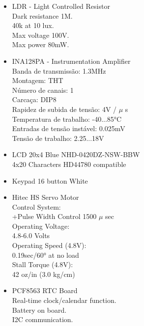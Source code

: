 \begin{minipage}{\linewidth}
\begin{minipage}{0.55\linewidth}
\begin{itemize}
	\item LDR - Light Controlled Resistor \\
		Dark resistance 1M.\\
		40k at 10 lux.\\
		Max voltage 100V.\\
		Max power 80mW.\\
	\item INA128PA - Instrumentation Amplifier \\
		Banda de transmissão: 1.3MHz \\
		Montagem: THT \\
		Número de canais: 1 \\
		Carcaça: DIP8 \\
		Rapidez de subida de tensão: 4V / $\mu$ s \\
		Temperatura de trabalho: -40...85°C \\
		Entradas de tensão instável: 0.025mV \\
		Tensão de trabalho: 2.25...18V \\
	\item LCD 20x4 Blue NHD-0420DZ-NSW-BBW \\
		4x20 Characters HD44780 compatible\\
	\item Keypad 16 button White \\
\end{itemize}
\end{minipage}
\begin{minipage}{0.65\linewidth}
\begin{itemize}
	\item Hitec HS  Servo Motor \\
		Control System:\\
		+Pulse Width Control 1500 $\mu$ sec \\
		Operating Voltage:\\ 
		4.8-6.0 Volts \\
		Operating Speed (4.8V):\\
		0.19sec/60° at no load \\
		Stall Torque (4.8V):\\
		42 oz/in (3.0 kg/cm) \\
	\item PCF8563 RTC Board \\
		Real-time clock/calendar function. \\ 
		Battery on board. \\
		I2C communication. \\
		\\
		\\
		\\
		\\
		\\
		\\
		\\
\end{itemize}
\end{minipage}
\end{minipage}
